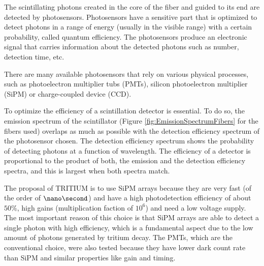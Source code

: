 The scintillating photons created in the core of the fiber and guided to its end are detected by photosensors. Photosensors have a sensitive part that is optimized to detect photons in a range of energy (usually in the visible range) with a certain probability, called quantum efficiency. The photosensors produce an electronic signal that carries information about the detected photons such as number, detection time, etc.

There are many available photosensors that rely on various physical processes, such as photoelectron multiplier tubs (PMTs), silicon photoelectron multiplier (SiPM) or charge-coupled device (CCD).  %

To optimize the efficiency of a scintillation detector is essential. To do so, the emission spectrum of the scintillator (Figure \ref{fig:EmissionSpectrumFibers} for the fibers used) overlaps as much as possible with the detection efficiency spectrum of the photosensor chosen. The detection efficiency spectrum shows the probability of detecting photons at a function of wavelength. The efficiency of a detector is proportional to the product of both, the emission and the detection efficiency spectra, and this is largest when both spectra match.

The proposal of TRITIUM is to use SiPM arrays because they are very fast (of the order of $\nano\second$) and have a high photodetection efficiency of about $50\%$, high gains (multiplication faction of $10^{6}$) and need a low voltage supply. The most important reason of this choice is that SiPM arrays are able to detect a single photon with high efficiency, which is a fundamental aspect due to the low amount of photons generated by tritium decay. The PMTs, which are the conventional choice, were also tested because they have lower dark count rate than SiPM and similar properties like gain and timing.




